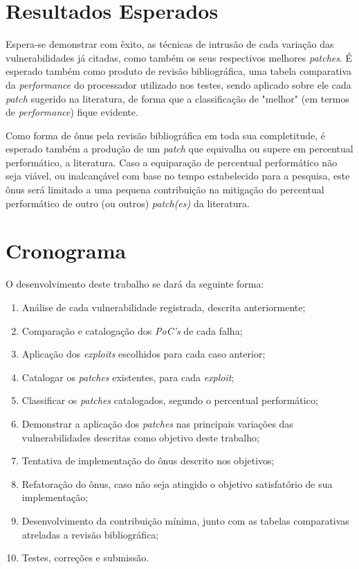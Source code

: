 \documentclass[
	12pt,				%
	openright,			%
	oneside,            %
	a4paper,			%
	chapter=TITLE,		%
	section=TITLE,		%
	subsection=TITLE,	%
	subsubsection=TITLE,%
	english,			%
	brazil,				%
]{abntex2}
\begin{document}
\chapter{Resultados Esperados}

Espera-se demonstrar com êxito, as técnicas de intrusão de cada variação das vulnerabilidades já citadas, como também os seus respectivos melhores \emph{patches}. É esperado também como produto de revisão bibliográfica, uma tabela comparativa da \emph{performance} do processador utilizado nos testes, sendo aplicado sobre ele cada \emph{patch} sugerido na literatura, de forma que a classificação de "melhor" (em termos de \emph{performance}) fique evidente.

Como forma de ônus pela revisão bibliográfica em toda sua completitude, é esperado também a produção de um \emph{patch} que equivalha ou supere em percentual performático, a literatura. Caso a equiparação de percentual performático não seja viável, ou inalcançável com base no tempo estabelecido para a pesquisa, este ônus será limitado a uma pequena contribuição na mitigação do percentual performático de outro (ou outros) \emph{patch(es)} da literatura.

\endgroup

\chapter{Cronograma}

O desenvolvimento deste trabalho se dará da seguinte forma:

\begin{enumerate}
	\item \label{anI} Análise de cada vulnerabilidade registrada, descrita anteriormente;
	\item \label{anII} Comparação e catalogação dos \emph{PoC's} de cada falha;
	\item \label{anIII} Aplicação dos \emph{exploits} escolhidos para cada caso anterior;
	\item \label{dI} Catalogar os \emph{patches} existentes, para cada \emph{exploit};
	\item \label{dII} Classificar os \emph{patches} catalogados, segundo o percentual performático;
	\item \label{dIII} Demonstrar a aplicação dos \emph{patches} nas principais variações das vulnerabilidades descritas como objetivo deste trabalho;
	\item \label{imI} Tentativa de implementação do ônus descrito nos objetivos;
	\item \label{imII} Refatoração do ônus, caso não seja atingido o objetivo satisfatório de sua implementação;
	\item \label{imIII} Desenvolvimento da contribuição mínima, junto com as tabelas comparativas atreladas a revisão bibliográfica;
	\item \label{final} Testes, correções e submissão.
\end{enumerate}
\end{document}
